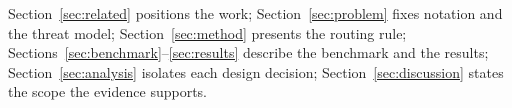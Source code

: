 Section~\ref{sec:related} positions the work; Section~\ref{sec:problem} fixes notation and
the threat model; Section~\ref{sec:method} presents the routing rule;
Sections~\ref{sec:benchmark}--\ref{sec:results} describe the benchmark and the results;
Section~\ref{sec:analysis} isolates each design decision; Section~\ref{sec:discussion}
states the scope the evidence supports.
